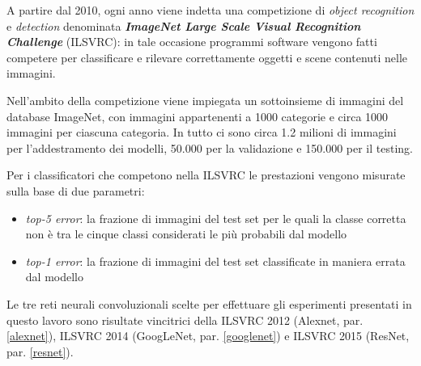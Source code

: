 A partire dal 2010, ogni anno viene indetta una competizione di \textit{object recognition} e \textit{detection} denominata \textbf{\textit{ImageNet Large Scale Visual Recognition Challenge}} (ILSVRC): in tale occasione programmi software vengono fatti competere per classificare e rilevare correttamente oggetti e scene contenuti nelle immagini.

Nell'ambito della competizione viene impiegata un sottoinsieme di immagini del database ImageNet, con immagini appartenenti a 1000 categorie e circa 1000 immagini per ciascuna categoria. In tutto ci sono circa 1.2 milioni di immagini per l'addestramento dei modelli, 50.000 per la validazione e 150.000 per il testing.

Per i classificatori che competono nella ILSVRC le prestazioni vengono misurate sulla base di due parametri:
\begin{itemize}
\item \textit{top-5 error}: la frazione di immagini del test set per le quali la classe corretta non è tra le cinque classi considerati le più probabili dal modello
\item \textit{top-1 error}: la frazione di immagini del test set classificate in maniera errata dal modello
\end{itemize}

Le tre reti neurali convoluzionali scelte per effettuare gli esperimenti presentati in questo lavoro sono risultate vincitrici della ILSVRC 2012 (Alexnet, par. \ref{alexnet}), ILSVRC 2014 (GoogLeNet, par. \ref{googlenet}) e ILSVRC 2015 (ResNet, par. \ref{resnet}).
